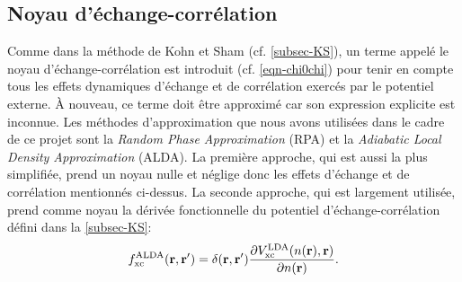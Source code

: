 \subsection{Noyau d'échange-corrélation}
Comme dans la méthode de Kohn et Sham (cf. \cref{subsec-KS}),
un terme appelé le noyau d'échange-corrélation est introduit (cf. \cref{eqn-chi0chi})
pour tenir en compte tous les effets dynamiques d'échange et de corrélation
exercés par le potentiel externe.
À nouveau, ce terme doit être approximé car son expression explicite est inconnue.
Les méthodes d'approximation que nous avons utilisées dans le cadre de ce projet sont
la \textit{Random Phase Approximation} (RPA) et
la \textit{Adiabatic Local Density Approximation} (ALDA).
La première approche, qui est aussi la plus simplifiée, prend un noyau nulle et
néglige donc les effets d'échange et de corrélation mentionnés ci-dessus.
La seconde approche, qui est largement utilisée,
prend comme noyau la dérivée fonctionnelle du potentiel d'échange-corrélation
défini dans la \cref{subsec-KS}:
\begin{equation*}
  f_{\textnormal{xc}}^{\textnormal{ALDA}}(\vb{r}, \vb{r}')
  = \delta(\vb{r}, \vb{r}')\pdv{V_{\textnormal{xc}}^{\textnormal{LDA}}(n(\vb{r}), \vb{r})}{n(\vb{r})}.
\end{equation*}
